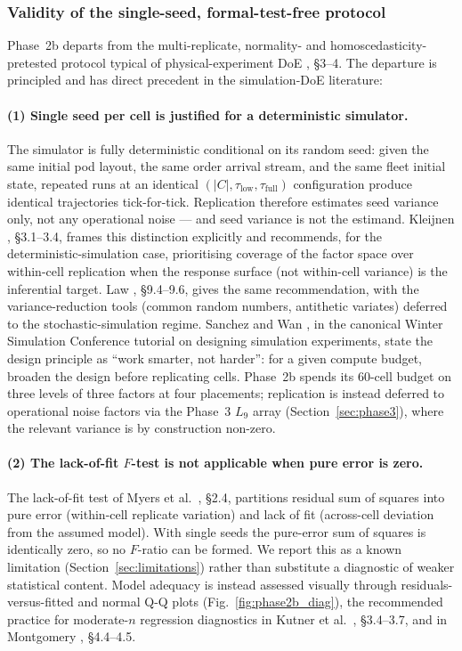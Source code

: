 \documentclass[conference]{IEEEtran}
\begin{document}
\subsubsection{Validity of the single-seed, formal-test-free protocol}
\label{sec:phase2b_validity}

Phase~2b departs from the multi-replicate, normality- and homoscedasticity-pretested protocol typical of physical-experiment DoE \cite{montgomery2017}, \S 3--4. The departure is principled and has direct precedent in the simulation-DoE literature:

\paragraph{(1) Single seed per cell is justified for a deterministic simulator.}
The simulator is fully deterministic conditional on its random seed: given the same initial pod layout, the same order arrival stream, and the same fleet initial state, repeated runs at an identical $(|C|, \tau_\text{low}, \tau_\text{full})$ configuration produce identical trajectories tick-for-tick. Replication therefore estimates seed variance only, not any operational noise --- and seed variance is not the estimand. Kleijnen \cite{kleijnen2015}, \S 3.1--3.4, frames this distinction explicitly and recommends, for the deterministic-simulation case, prioritising coverage of the factor space over within-cell replication when the response surface (not within-cell variance) is the inferential target. Law \cite{law2015}, \S 9.4--9.6, gives the same recommendation, with the variance-reduction tools (common random numbers, antithetic variates) deferred to the stochastic-simulation regime. Sanchez and Wan \cite{sanchez2015}, in the canonical Winter Simulation Conference tutorial on designing simulation experiments, state the design principle as ``work smarter, not harder'': for a given compute budget, broaden the design before replicating cells. Phase~2b spends its 60-cell budget on three levels of three factors at four placements; replication is instead deferred to operational noise factors via the Phase~3 $L_9$ array (Section~\ref{sec:phase3}), where the relevant variance is by construction non-zero.

\paragraph{(2) The lack-of-fit $F$-test is not applicable when pure error is zero.}
The lack-of-fit test of Myers et al.\ \cite{myers2016}, \S 2.4, partitions residual sum of squares into pure error (within-cell replicate variation) and lack of fit (across-cell deviation from the assumed model). With single seeds the pure-error sum of squares is identically zero, so no $F$-ratio can be formed. We report this as a known limitation (Section~\ref{sec:limitations}) rather than substitute a diagnostic of weaker statistical content. Model adequacy is instead assessed visually through residuals-versus-fitted and normal Q-Q plots (Fig.~\ref{fig:phase2b_diag}), the recommended practice for moderate-$n$ regression diagnostics in Kutner et al.\ \cite{kutner2005}, \S 3.4--3.7, and in Montgomery \cite{montgomery2017}, \S 4.4--4.5.
\end{document}
